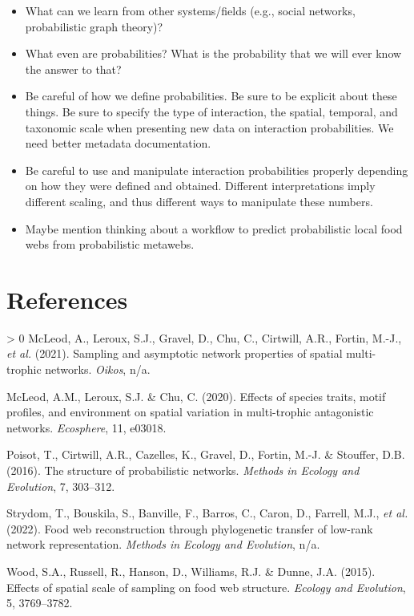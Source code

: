 \documentclass[10pt,oneside]{article}
\newlength{\cslhangindent}
\newenvironment{CSLReferences}[3] %
 {%
  \setlength{\parindent}{0pt}
  \ifodd #1 \everypar{\setlength{\hangindent}{\cslhangindent}}\ignorespaces\fi
  \ifnum #2 > 0
  \setlength{\parskip}{#2\baselineskip}
  \fi
 }%
 {}
\begin{document}
\begin{itemize}
\tightlist
\item
  What can we learn from other systems/fields (e.g., social networks,
  probabilistic graph theory)?
\item
  What even are probabilities? What is the probability that we will ever
  know the answer to that?
\item
  Be careful of how we define probabilities. Be sure to be explicit
  about these things. Be sure to specify the type of interaction, the
  spatial, temporal, and taxonomic scale when presenting new data on
  interaction probabilities. We need better metadata documentation.
\item
  Be careful to use and manipulate interaction probabilities properly
  depending on how they were defined and obtained. Different
  interpretations imply different scaling, and thus different ways to
  manipulate these numbers.
\item
  Maybe mention thinking about a workflow to predict probabilistic local
  food webs from probabilistic metawebs.
\end{itemize}

\hypertarget{references}{%
\section*{References}\label{references}}

\hypertarget{refs}{}
\begin{CSLReferences}{1}{0}
\leavevmode\hypertarget{ref-McLeod2021SamAsy}{}%
McLeod, A., Leroux, S.J., Gravel, D., Chu, C., Cirtwill, A.R., Fortin,
M.-J., \emph{et al.} (2021). Sampling and asymptotic network properties
of spatial multi-trophic networks. \emph{Oikos}, n/a.

\leavevmode\hypertarget{ref-McLeod2020EffSpe}{}%
McLeod, A.M., Leroux, S.J. \& Chu, C. (2020). Effects of species traits,
motif profiles, and environment on spatial variation in multi-trophic
antagonistic networks. \emph{Ecosphere}, 11, e03018.

\leavevmode\hypertarget{ref-Poisot2016StrProa}{}%
Poisot, T., Cirtwill, A.R., Cazelles, K., Gravel, D., Fortin, M.-J. \&
Stouffer, D.B. (2016). The structure of probabilistic networks.
\emph{Methods in Ecology and Evolution}, 7, 303--312.

\leavevmode\hypertarget{ref-Strydom2022FooWeb}{}%
Strydom, T., Bouskila, S., Banville, F., Barros, C., Caron, D., Farrell,
M.J., \emph{et al.} (2022). Food web reconstruction through phylogenetic
transfer of low-rank network representation. \emph{Methods in Ecology
and Evolution}, n/a.

\leavevmode\hypertarget{ref-Wood2015EffSpa}{}%
Wood, S.A., Russell, R., Hanson, D., Williams, R.J. \& Dunne, J.A.
(2015). Effects of spatial scale of sampling on food web structure.
\emph{Ecology and Evolution}, 5, 3769--3782.

\end{CSLReferences}
\end{document}
